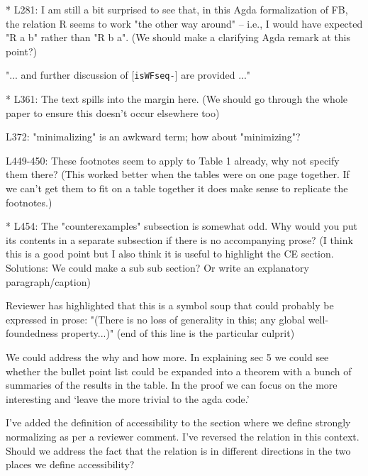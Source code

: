 \documentclass{article}
\newcommand{\cmark}{\ding{51}}%
\newcommand{\done}{\rlap{$\square$}{\raisebox{2pt}{\large\hspace{1pt}\cmark}}%
\hspace{-2.5pt}}
\begin{document}
\begin{todolist}
    \item [\done] * L281: I am still a bit surprised to see that, in this Agda formalization of FB, the relation R seems to work "the other way around" -- i.e., I would have expected "R a b" rather than "R b a". (We should make a clarifying Agda remark at this point?) 
    \item [\done] "... and further discussion of [\texttt{isWFseq-}] are provided ..." 
    \item [\done] * L361: The text spills into the margin here. (We should go through the whole paper to ensure this doesn't occur elsewhere too)
    \item * L372: "minimalizing" is an awkward term; how about "minimizing"? 
    \item * L449-450: These footnotes seem to apply to Table 1 already, why not specify them there? (This worked better when the tables were on one page together. If we can't get them to fit on a table together it does make sense to replicate the footnotes.)
    \item [\done] * L454: The "counterexamples" subsection is somewhat odd. Why would you put its contents in a separate subsection if there is no accompanying prose? (I think this is a good point but I also think it is useful to highlight the CE section. Solutions: We could make a sub sub section? Or write an explanatory paragraph/caption)
    \item Reviewer has highlighted that this is a symbol soup that could probably be expressed in prose: "(There is no loss of generality in this; any global well-foundedness property...)" (end of this line is the particular culprit) 
    \item We could address the why and how more. In explaining sec 5 we could see whether the bullet point list could be expanded into a theorem with a bunch of summaries of the results in the table. In the proof we can focus on the more interesting and `leave the more trivial to the agda code.'
    \item I've added the definition of accessibility to the section where we define strongly normalizing as per a reviewer comment. I've reversed the relation in this context. Should we address the fact that the relation is in different directions in the two places we define accessibility?

\end{todolist}
\end{document}
